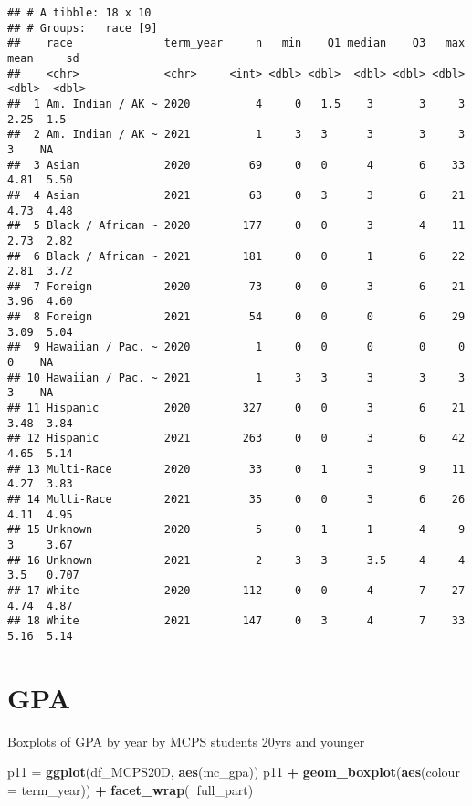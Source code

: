 \documentclass[]{article}
\newenvironment{Shaded}{\begin{snugshade}}{\end{snugshade}}
\newcommand{\DataTypeTok}[1]{\textcolor[rgb]{0.13,0.29,0.53}{#1}}
\newcommand{\KeywordTok}[1]{\textcolor[rgb]{0.13,0.29,0.53}{\textbf{#1}}}
\newcommand{\NormalTok}[1]{#1}
\newcommand{\OperatorTok}[1]{\textcolor[rgb]{0.81,0.36,0.00}{\textbf{#1}}}
\newcommand{\StringTok}[1]{\textcolor[rgb]{0.31,0.60,0.02}{#1}}
\begin{document}
\begin{verbatim}
## # A tibble: 18 x 10
## # Groups:   race [9]
##    race              term_year     n   min    Q1 median    Q3   max  mean     sd
##    <chr>             <chr>     <int> <dbl> <dbl>  <dbl> <dbl> <dbl> <dbl>  <dbl>
##  1 Am. Indian / AK ~ 2020          4     0   1.5    3       3     3  2.25  1.5  
##  2 Am. Indian / AK ~ 2021          1     3   3      3       3     3  3    NA    
##  3 Asian             2020         69     0   0      4       6    33  4.81  5.50 
##  4 Asian             2021         63     0   3      3       6    21  4.73  4.48 
##  5 Black / African ~ 2020        177     0   0      3       4    11  2.73  2.82 
##  6 Black / African ~ 2021        181     0   0      1       6    22  2.81  3.72 
##  7 Foreign           2020         73     0   0      3       6    21  3.96  4.60 
##  8 Foreign           2021         54     0   0      0       6    29  3.09  5.04 
##  9 Hawaiian / Pac. ~ 2020          1     0   0      0       0     0  0    NA    
## 10 Hawaiian / Pac. ~ 2021          1     3   3      3       3     3  3    NA    
## 11 Hispanic          2020        327     0   0      3       6    21  3.48  3.84 
## 12 Hispanic          2021        263     0   0      3       6    42  4.65  5.14 
## 13 Multi-Race        2020         33     0   1      3       9    11  4.27  3.83 
## 14 Multi-Race        2021         35     0   0      3       6    26  4.11  4.95 
## 15 Unknown           2020          5     0   1      1       4     9  3     3.67 
## 16 Unknown           2021          2     3   3      3.5     4     4  3.5   0.707
## 17 White             2020        112     0   0      4       7    27  4.74  4.87 
## 18 White             2021        147     0   3      4       7    33  5.16  5.14
\end{verbatim}

\hypertarget{gpa}{%
\section{GPA}\label{gpa}}

Boxplots of GPA by year by MCPS students 20yrs and younger

\begin{Shaded}
\begin{Highlighting}[]
\NormalTok{p11 =}\StringTok{ }\KeywordTok{ggplot}\NormalTok{(df_MCPS20D, }\KeywordTok{aes}\NormalTok{(mc_gpa))}
\NormalTok{p11 }\OperatorTok{+}\StringTok{ }\KeywordTok{geom_boxplot}\NormalTok{(}\KeywordTok{aes}\NormalTok{(}\DataTypeTok{colour =}\NormalTok{ term_year)) }\OperatorTok{+}
\StringTok{       }\KeywordTok{facet_wrap}\NormalTok{(}\OperatorTok{~}\NormalTok{full_part)}
\end{Highlighting}
\end{Shaded}
\end{document}
